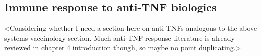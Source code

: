 \begin{outline}
\subsection{Immune response to anti-TNF biologics}
<Considering whether I need a section here on anti-TNFs analogous to the above systems vaccinology section. Much anti-TNF response literature is already reviewed in chapter 4 introduction though, so maybe no point duplicating.>
%
%
%
%

\end{outline}

